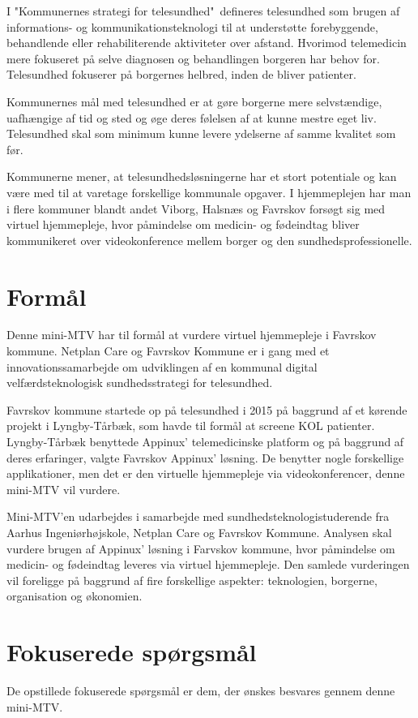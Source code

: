 I "Kommunernes strategi for telesundhed"\ defineres telesundhed som brugen af informations- og kommunikationsteknologi til at understøtte forebyggende, behandlende eller rehabiliterende aktiviteter over afstand. Hvorimod telemedicin mere fokuseret på selve diagnosen og behandlingen borgeren har behov for. Telesundhed fokuserer på borgernes helbred, inden de bliver patienter\cite{KLs}\cite{sundhed}.

Kommunernes mål med telesundhed er at gøre borgerne mere selvstændige, uafhængige af tid og sted og øge deres følelsen af at kunne mestre eget liv. Telesundhed skal som minimum kunne levere ydelserne af samme kvalitet som før\cite{KLs}.

Kommunerne mener, at telesundhedsløsningerne har et stort potentiale og kan være med til at varetage forskellige kommunale opgaver. I hjemmeplejen har man i flere kommuner blandt andet Viborg\cite{viborg}, Halsnæs\cite{hals} og Favrskov forsøgt sig med virtuel hjemmepleje, hvor påmindelse om medicin- og fødeindtag bliver kommunikeret over videokonference mellem borger og den sundhedsprofessionelle. 

\section{Formål}
Denne mini-MTV har til formål at vurdere virtuel hjemmepleje i Favrskov kommune. Netplan Care og Favrskov Kommune er i gang med et innovationssamarbejde om udviklingen af en kommunal digital velfærdsteknologisk sundhedsstrategi for telesundhed. 

Favrskov kommune startede op på telesundhed i 2015\cite{projektplan} på baggrund af et kørende projekt i Lyngby-Tårbæk, som havde til formål at screene KOL patienter. Lyngby-Tårbæk benyttede Appinux' telemedicinske platform og på baggrund af deres erfaringer, valgte Favrskov Appinux' løsning\cite{Karin}. De benytter nogle forskellige applikationer, men det er den virtuelle hjemmepleje via videokonferencer, denne mini-MTV vil vurdere.    

Mini-MTV'en udarbejdes i samarbejde med sundhedsteknologistuderende fra Aarhus Ingeniørhøjskole, Netplan Care og Favrskov Kommune. Analysen skal vurdere brugen af Appinux' løsning i Farvskov kommune, hvor påmindelse om medicin- og fødeindtag leveres via virtuel hjemmepleje. Den samlede vurderingen vil foreligge på baggrund af fire forskellige aspekter: teknologien, borgerne, organisation og økonomien.   

\section{Fokuserede spørgsmål}
De opstillede fokuserede spørgsmål er dem, der ønskes besvares gennem denne mini-MTV. 

